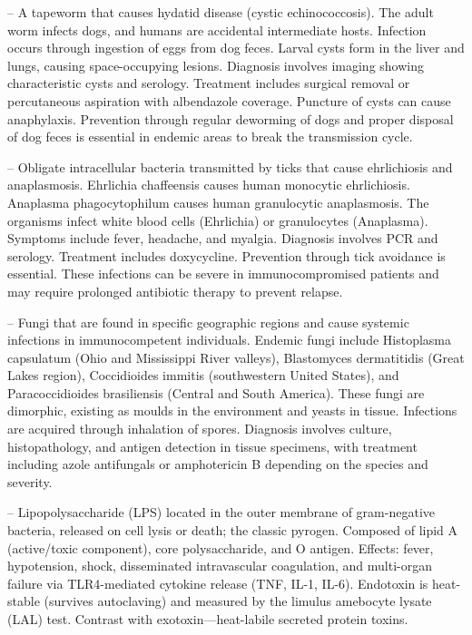 -- A tapeworm that causes hydatid disease (cystic echinococcosis). The adult worm infects dogs, and humans are accidental intermediate hosts. Infection occurs through ingestion of eggs from dog feces. Larval cysts form in the liver and lungs, causing space-occupying lesions. Diagnosis involves imaging showing characteristic cysts and serology. Treatment includes surgical removal or percutaneous aspiration with albendazole coverage. Puncture of cysts can cause anaphylaxis. Prevention through regular deworming of dogs and proper disposal of dog feces is essential in endemic areas to break the transmission cycle.

-- Obligate intracellular bacteria transmitted by ticks that cause ehrlichiosis and anaplasmosis. Ehrlichia chaffeensis causes human monocytic ehrlichiosis. Anaplasma phagocytophilum causes human granulocytic anaplasmosis. The organisms infect white blood cells (Ehrlichia) or granulocytes (Anaplasma). Symptoms include fever, headache, and myalgia. Diagnosis involves PCR and serology. Treatment includes doxycycline. Prevention through tick avoidance is essential. These infections can be severe in immunocompromised patients and may require prolonged antibiotic therapy to prevent relapse.

-- Fungi that are found in specific geographic regions and cause systemic infections in immunocompetent individuals. Endemic fungi include Histoplasma capsulatum (Ohio and Mississippi River valleys), Blastomyces dermatitidis (Great Lakes region), Coccidioides immitis (southwestern United States), and Paracoccidioides brasiliensis (Central and South America). These fungi are dimorphic, existing as moulds in the environment and yeasts in tissue. Infections are acquired through inhalation of spores. Diagnosis involves culture, histopathology, and antigen detection in tissue specimens, with treatment including azole antifungals or amphotericin B depending on the species and severity.

-- Lipopolysaccharide (LPS) located in the outer membrane of gram-negative bacteria, released on cell lysis or death; the classic pyrogen. Composed of lipid A (active/toxic component), core polysaccharide, and O antigen. Effects: fever, hypotension, shock, disseminated intravascular coagulation, and multi-organ failure via TLR4-mediated cytokine release (TNF, IL-1, IL-6). Endotoxin is heat-stable (survives autoclaving) and measured by the limulus amebocyte lysate (LAL) test. Contrast with exotoxin—heat-labile secreted protein toxins.

